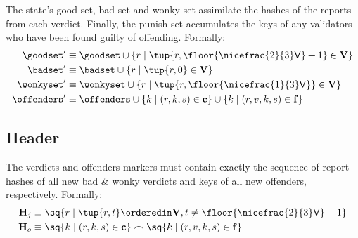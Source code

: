The state's good-set, bad-set and wonky-set assimilate the hashes of the reports from each verdict. Finally, the punish-set accumulates the keys of any validators who have been found guilty of offending. Formally:
\begin{align}
  \goodset' &\equiv \goodset \cup \{r \mid \tup{r, \floor{\nicefrac{2}{3}\mathsf{V}} + 1} \in \verdicts \} \\
  \badset' &\equiv \badset \cup \{r \mid \tup{r, 0} \in \verdicts \} \\
  \wonkyset' &\equiv \wonkyset \cup \{r \mid \tup{r, \floor{\nicefrac{1}{3}\mathsf{V}}} \in \verdicts \} \\
  \offenders' &\equiv \offenders \cup \{ k \mid (r, k, s) \in \xtculprits \}\cup \{ k \mid (r, v, k, s) \in \xtfaults \}
\end{align}

\subsection{Header}\label{sec:judgementmarker}

The verdicts and offenders markers must contain exactly the sequence of report hashes of all new bad \& wonky verdicts and keys of all new offenders, respectively. Formally:
\begin{align}
  \mathbf{H}_j &\equiv \sq{r \mid \tup{r, t} \orderedin \verdicts, t \ne \floor{\nicefrac{2}{3}\mathsf{V}} + 1}\\
  \mathbf{H}_o &\equiv \sq{ k \mid (r, k, s) \in \xtculprits} \frown \sq{ k \mid (r, v, k, s) \in \xtfaults }
\end{align}

